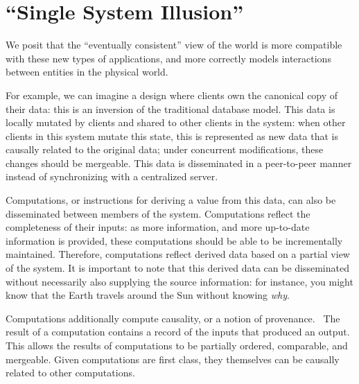 \documentclass[nocopyrightspace, preprint]{sigplanconf}
\theoremstyle{definition}
\theoremstyle{remark}
\begin{document}
\section{``Single System Illusion''}
We posit that the ``eventually consistent'' view of the world is more compatible with these new types of applications, and more correctly models interactions between entities in the physical world.

For example, we can imagine a design where clients own the canonical copy of their data: this is an inversion of the traditional database model.  This data is locally mutated by clients and shared to other clients in the system: when other clients in this system mutate this state, this is represented as new data that is causally related to the original data; under concurrent modifications, these changes should be mergeable.  This data is disseminated in a peer-to-peer manner instead of synchronizing with a centralized server.

Computations, or instructions for deriving a value from this data, can also be disseminated between members of the system.  Computations reflect the completeness of their inputs: as more information, and more up-to-date information is provided, these computations should be able to be incrementally maintained.  Therefore, computations reflect derived data based on a partial view of the system.  It is important to note that this derived data can be disseminated without necessarily also supplying the source information: for instance, you might know that the Earth travels around the Sun without knowing \textit{why}.

Computations additionally compute causality, or a notion of provenance.~\cite{zaharia2012resilient, green2007provenance}  The result of a computation contains a record of the inputs that produced an output.  This allows the results of computations to be partially ordered, comparable, and mergeable.  Given computations are first class, they themselves can be causally related to other computations.
\end{document}
